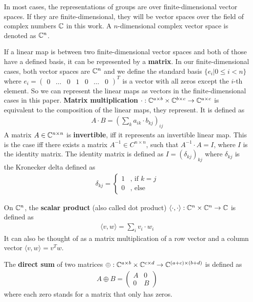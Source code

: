 In most cases, the representations of groups are over finite-dimensional vector spaces.
If they are finite-dimensional, they will be vector spaces over the field of complex numbers $\mathbb{C}$ in this work.
A $n$-dimensional complex vector space is denoted as $\mathbb{C}^n$.

If a linear map is between two finite-dimensional vector spaces and both of those have a defined basis, it can be represented by a \textbf{matrix}.
In our finite-dimensional cases, both vector spaces are $\mathbb{C}^n$ and we define the standard basis $\{e_i | 0 \leq i < n\}$ where $e_i = \begin{pmatrix} 0 & \ldots & 0 & 1 & 0 & \ldots & 0 \end{pmatrix}^T$ is a vector with all zeros except the $i$-th element.
So we can represent the linear maps as vectors in the finite-dimensional cases in this paper.
\textbf{Matrix multiplication} $\cdot: \mathbb{C}^{a \times b} \times \mathbb{C}^{b \times c} \to \mathbb{C}^{a \times c}$ is equivalent to the composition of the linear maps, they represent.
It is defined as
\begin{align}
    A \cdot B = \left(\sum_k a_{ik} \cdot b_{kj}\right)_{ij}
\end{align}
A matrix $A \in \mathbb{C}^{n \times n}$ is \textbf{invertible}, iff it represents an invertible linear map.
This is the case iff there exists a matrix $A^{-1} \in C^{n \times n}$, such that $A^{-1} \cdot A = I$, where $I$ is the identity matrix. 
The identity matrix is defined as $I = (\delta_{kj})_{kj}$ where $\delta_{kj}$ is the Kronecker delta defined as
\begin{align}
    \delta_{kj} = \begin{cases}
        1 & \text{, if } k = j \\
        0 & \text{, else}
    \end{cases}
\end{align}

On $\mathbb{C}^n$, the \textbf{scalar product} (also called dot product) $\langle \cdot, \cdot \rangle: \mathbb{C}^n \times \mathbb{C}^n \to \mathbb{C}$ is defined as
\begin{align}
    \langle v, w \rangle = \sum_i v_i \cdot w_i
\end{align}
It can also be thought of as a matrix multiplication of a row vector and a column vector $\langle v, w \rangle = v^T w$.

The \textbf{direct sum} of two matrices $\oplus: \mathbb{C}^{a \times b} \times \mathbb{C}^{c \times d} \to \mathbb{C}^{(a + c) \times (b + d)}$ is defined as
\begin{align}
    A \oplus B = \begin{pmatrix}
        A & 0 \\
        0 & B
    \end{pmatrix}
\end{align}
where each zero stands for a matrix that only has zeros.

